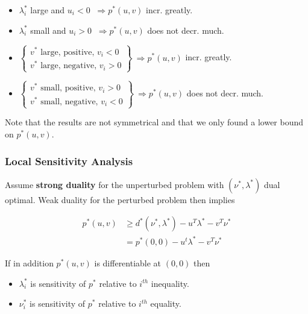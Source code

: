 \documentclass[8pt,a4paper]{scrartcl}
\begin{document}
\begin{multicols*}{3}
\begin{multicols*}{4}
\small
\begin{itemize}
\item[] $\lambda_i^\ast$ large and $u_i<0$ $\ \Rightarrow p^\ast(u,v)$ incr. greatly.
\item[] $\lambda_i^\ast$ small and $u_i>0$ $\ \Rightarrow p^\ast(u,v)$ does not decr. much.
\item[] $\left\{\begin{matrix}
v^\ast\text{ large, positive, }v_i<0\\
v^\ast\text{ large, negative, }v_i>0
\end{matrix}\right\}\ \Rightarrow p^\ast(u,v)$ incr. greatly.
\item[] $\left\{\begin{matrix}
v^\ast\text{ small, positive, }v_i>0\\
v^\ast\text{ small, negative, }v_i<0
\end{matrix}\right\}\ \Rightarrow p^\ast(u,v)$ does not decr. much.
\end{itemize}
\normalsize

Note that the results are not symmetrical and that we only found a lower bound on $p^\ast(u,v)$.

\subsubsection{Local Sensitivity Analysis}

Assume \textbf{strong duality} for the unperturbed problem with $(\nu^\ast,\lambda^\ast)$ dual optimal. Weak duality for the perturbed problem then implies

\begin{align*}
p^\ast(u,v)&\geq d^\ast(\nu^\ast,\lambda^\ast)-u^T\lambda^\ast-v^T\nu^\ast\\
&=p^\ast(0,0)-u^t\lambda^\ast-v^T\nu^\ast
\end{align*}

If in addition $p^\ast(u,v)$ is differentiable at $(0,0)$ then 


\begin{itemize}
\item $\lambda_i^\ast$ is sensitivity of $p^\ast$ relative to $i^{th}$ inequality.
\item $\nu_i^\ast$ is sensitivity of $p^\ast$ relative to $i^{th}$ equality.
\end{itemize}


\end{multicols*}
\end{multicols*}
\end{document}
